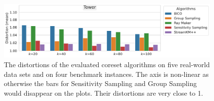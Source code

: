\begin{figure}
  \caption{The distortions of the evaluated coreset algorithms on five real-world data sets and on four benchmark instances. The axis is non-linear as otherwise the bars for Sensitivity Sampling and Group Sampling would disappear on the plots. Their distortions are very close to 1.}
  \label{fig:distortions}
  \includegraphics[width=.69\linewidth]{figures/distortions-mean-Tower.pdf}
  \newline \newline
  \newline \newline
  \newline \newline
\end{figure}
